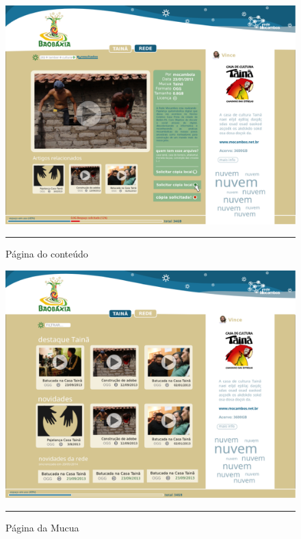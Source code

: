 \begin{figure}[htbp]
  \centering
  \includegraphics[width=\textwidth]{./Fig/layout-pgCONTEUDO.pdf}
  \rule{35em}{0.5pt}
  \caption[Página do conteúdo]{Página do conteúdo}
  \label{fig:layout-pgCONTEUDO}
\end{figure}

\begin{figure}[htbp]
  \centering
  \includegraphics[width=\textwidth]{./Fig/layout-pgMUCUA.pdf}
  \rule{35em}{0.5pt}
  \caption[Página da Mucua]{Página da Mucua}
  \label{fig:layout-pgMUCUA}
\end{figure}

